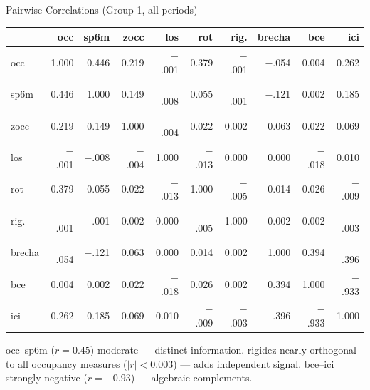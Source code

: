 \documentclass[aspectratio=169]{beamer}
\begin{document}
\begin{frame}{Pairwise Correlations (Group 1, all periods)}
  \begin{center}\scriptsize
    \begin{tabular}{lrrrrrrrrr}
      \toprule
        & occ & sp6m & zocc & los & rot & rig. & brecha & bce & ici \\
      \midrule
      occ     & 1.000 & 0.446 & 0.219 &$-$.001& 0.379 &$-$.001&$-$.054& 0.004 & 0.262 \\
      sp6m    & 0.446 & 1.000 & 0.149 &$-$.008& 0.055 &$-$.001&$-$.121& 0.002 & 0.185 \\
      zocc    & 0.219 & 0.149 & 1.000 &$-$.004& 0.022 & 0.002 & 0.063 & 0.022 & 0.069 \\
      los     &$-$.001&$-$.008&$-$.004& 1.000 &$-$.013& 0.000 & 0.000 &$-$.018& 0.010 \\
      rot     & 0.379 & 0.055 & 0.022 &$-$.013& 1.000 &$-$.005& 0.014 & 0.026 &$-$.009\\
      rig.    &$-$.001&$-$.001& 0.002 & 0.000 &$-$.005& 1.000 & 0.002 & 0.002 &$-$.003\\
      brecha  &$-$.054&$-$.121& 0.063 & 0.000 & 0.014 & 0.002 & 1.000 & 0.394 &$-$.396\\
      bce     & 0.004 & 0.002 & 0.022 &$-$.018& 0.026 & 0.002 & 0.394 & 1.000 &$-$.933\\
      ici     & 0.262 & 0.185 & 0.069 & 0.010 &$-$.009&$-$.003&$-$.396&$-$.933& 1.000 \\
      \bottomrule
    \end{tabular}
  \end{center}
  \smallskip
  \begin{keybox}
    \scriptsize
    occ--sp6m ($r=0.45$) moderate --- distinct information.
    rigidez nearly orthogonal to all occupancy measures ($|r|<0.003$) ---
    adds independent signal.
    bce--ici strongly negative ($r=-0.93$) --- algebraic complements.
  \end{keybox}
\end{frame}
\end{document}
